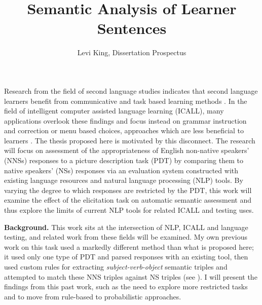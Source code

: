 \documentclass[11pt]{article}
\title{\vspace{-5em}Semantic Analysis of Learner Sentences}
\author{\vspace{-8em}Levi King, Dissertation Prospectus} %
\date{\vspace{-2em}}
\begin{document}
\maketitle

\noindent Research from the field of second language studies indicates that second language learners benefit from communicative and task based learning methods \citep{CelceMurcia:1991:GrammarPedagogy, CelceMurcia:2002:GrammarThroughContext, LarsenFreeman:1991:TeachingGrammar, Ellis:2006:CurrentIssues}. In the field of intelligent computer assisted language learning (ICALL), many applications overlook these findings and focus instead on grammar instruction and correction or menu based choices, approaches which are less beneficial to learners \citep{bailey:meurers:08,Amaral.Meurers-11}. The thesis proposed here is motivated by this disconnect.
The research will focus on assessment of the appropriateness of English non-native speakers' (NNSs) responses to a picture description task (PDT) by comparing them to native speakers' (NSs) responses via an evaluation system constructed with existing language resources and natural language processing (NLP) tools. By varying the degree to which responses are restricted by the PDT, this work will examine the effect of the elicitation task on automatic semantic assessment and thus explore the limits of current NLP tools for related ICALL and testing uses.

\noindent \textbf{Background.} 
This work sits at the intersection of NLP, ICALL and language testing, and related work from these fields will be examined. My own previous work on this task used a markedly different method than what is proposed here; it used only one type of PDT and parsed responses with an existing tool, then used custom rules for extracting \textit{subject-verb-object} semantic triples and attempted to match these NNS triples against NS triples (see \citet{king:dickinson:13,king:dickinson:14}). I will present the findings from this past work, such as the need to explore more restricted tasks and to move from rule-based to probabilistic approaches.
\end{document}
